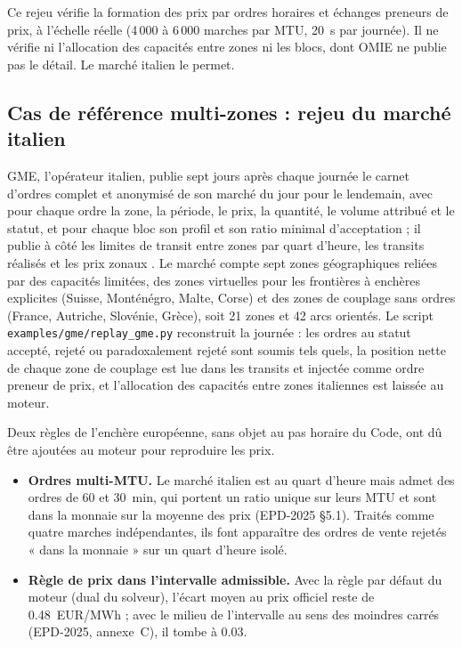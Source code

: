 \documentclass[a4paper,12pt]{article}
\theoremstyle{definition}
\begin{document}
Ce rejeu vérifie la formation des prix par ordres horaires et échanges preneurs de prix, à l'échelle réelle (4\,000 à 6\,000 marches par MTU, 20~s par journée). Il ne vérifie ni l'allocation des capacités entre zones ni les blocs, dont OMIE ne publie pas le détail. Le marché italien le permet.

\subsection{Cas de référence multi-zones : rejeu du marché italien}\label{sec:gme}

GME, l'opérateur italien, publie sept jours après chaque journée le carnet d'ordres complet et anonymisé de son marché du jour pour le lendemain, avec pour chaque ordre la zone, la période, le prix, la quantité, le volume attribué et le statut, et pour chaque bloc son profil et son ratio minimal d'acceptation ; il publie à côté les limites de transit entre zones par quart d'heure, les transits réalisés et les prix zonaux \citep{gme2026}. Le marché compte sept zones géographiques reliées par des capacités limitées, des zones virtuelles pour les frontières à enchères explicites (Suisse, Monténégro, Malte, Corse) et des zones de couplage sans ordres (France, Autriche, Slovénie, Grèce), soit 21 zones et 42 arcs orientés. Le script \texttt{examples/gme/replay\_gme.py} reconstruit la journée : les ordres au statut accepté, rejeté ou paradoxalement rejeté sont soumis tels quels, la position nette de chaque zone de couplage est lue dans les transits et injectée comme ordre preneur de prix, et l'allocation des capacités entre zones italiennes est laissée au moteur.

Deux règles de l'enchère européenne, sans objet au pas horaire du Code, ont dû être ajoutées au moteur pour reproduire les prix.

\begin{itemize}
\item \textbf{Ordres multi-MTU.} Le marché italien est au quart d'heure mais admet des ordres de 60 et 30~min, qui portent un ratio unique sur leurs MTU et sont dans la monnaie sur la moyenne des prix (EPD-2025 §5.1). Traités comme quatre marches indépendantes, ils font apparaître des ordres de vente rejetés « dans la monnaie » sur un quart d'heure isolé.
\item \textbf{Règle de prix dans l'intervalle admissible.} Avec la règle par défaut du moteur (dual du solveur), l'écart moyen au prix officiel reste de 0.48~EUR/MWh ; avec le milieu de l'intervalle au sens des moindres carrés (EPD-2025, annexe~C), il tombe à 0.03.
\end{itemize}
\end{document}

